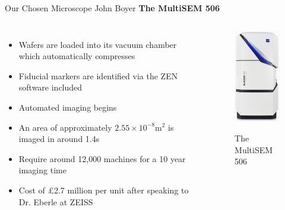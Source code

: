 \documentclass[10pt]{beamer}
\begin{document}
\begin{frame}{Our Chosen Microscope \hspace{0pt plus 1 filll} \small{John Boyer}}
	\textbf{The MultiSEM 506}
	\begin{columns}[T,onlytextwidth]
		\begin{itemize}[label={$\bullet$}]
			
			
			\item Wafers are loaded into its vacuum chamber which automatically compresses
			
			\item Fiducial markers are identified via the ZEN software included\cite{ZeissLec}
			
			\item Automated imaging begins
			\item An area of approximately $2.55\times10^{-8}$m$^2$ is imaged in around 1.4s \cite{ZeissMulti}
			
			\vspace{0.5cm}
			\item Require around 12,000 machines for a 10 year imaging time
			\item Cost of \pounds 2.7 million per unit after speaking to Dr. Eberle at ZEISS
			
		\end{itemize}
		\begin{figure}
			\centering
			\includegraphics[totalheight=5cm,width=2.5cm]{multisem}
			\caption \small The MultiSEM 506 \cite{ZeissMulti}
		\end{figure}
	\end{columns}
\end{frame}
\end{document}
